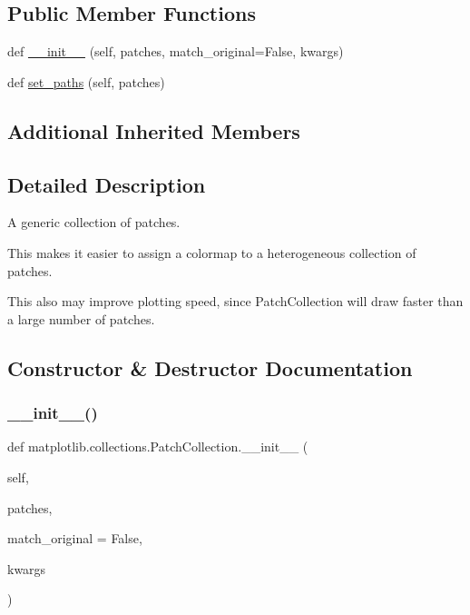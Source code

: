 \subsection*{Public Member Functions}
\begin{DoxyCompactItemize}
\item 
def \hyperlink{classmatplotlib_1_1collections_1_1PatchCollection_a8ed0c953dd436b697b1bbef971078b3a}{\+\_\+\+\_\+init\+\_\+\+\_\+} (self, patches, match\+\_\+original=False, kwargs)
\item 
def \hyperlink{classmatplotlib_1_1collections_1_1PatchCollection_a5c4266f33d8ad1a60c8528963f6cdcdd}{set\+\_\+paths} (self, patches)
\end{DoxyCompactItemize}
\subsection*{Additional Inherited Members}


\subsection{Detailed Description}
\begin{DoxyVerb}A generic collection of patches.

This makes it easier to assign a colormap to a heterogeneous
collection of patches.

This also may improve plotting speed, since PatchCollection will
draw faster than a large number of patches.
\end{DoxyVerb}
 

\subsection{Constructor \& Destructor Documentation}
\mbox{\label{classmatplotlib_1_1collections_1_1PatchCollection_a8ed0c953dd436b697b1bbef971078b3a}} 
\subsubsection{\texorpdfstring{\+\_\+\+\_\+init\+\_\+\+\_\+()}{\_\_init\_\_()}}
{\footnotesize\ttfamily def matplotlib.\+collections.\+Patch\+Collection.\+\_\+\+\_\+init\+\_\+\+\_\+ (\begin{DoxyParamCaption}\item[{}]{self,  }\item[{}]{patches,  }\item[{}]{match\+\_\+original = {\ttfamily False},  }\item[{}]{kwargs }\end{DoxyParamCaption})}

